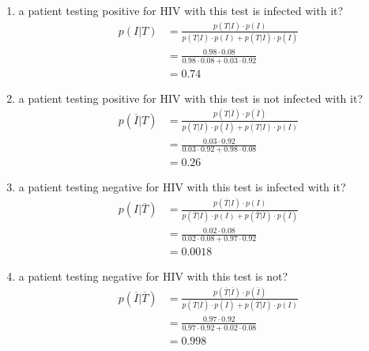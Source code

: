 \documentclass[a4paper]{article}
\begin{document}
\begin{enumerate}
	\item a patient testing positive for HIV with this test is infected with it?
	      \begin{align*}
		      p(I|T) & = \frac{p(T|I) \cdot p(I)}{p(T|I) \cdot p(I) + p(T|\overline{I}) \cdot p(\overline{I})} \\
		             & = \frac{0.98 \cdot 0.08}{0.98 \cdot 0.08 + 0.03 \cdot 0.92}                             \\
		             & = 0.74
	      \end{align*}
	\item a patient testing positive for HIV with this test is not infected with it?
	      \begin{align*}
		      p(\overline{I}|T) & = \frac{p(T|\overline{I}) \cdot p(\overline{I})}{p(T|\overline{I}) \cdot p(\overline{I}) + p(T|I) \cdot p(I)} \\
		                        & = \frac{0.03 \cdot 0.92}{0.03 \cdot 0.92 + 0.98 \cdot 0.08}                                                   \\
		                        & = 0.26
	      \end{align*}
	\item a patient testing negative for HIV with this test is infected with it?
	      \begin{align*}
		      p(I|\overline{T}) & = \frac{p(\overline{T}|I) \cdot p(I)}{p(\overline{T}|I) \cdot p(I) + p(\overline{T}|\overline{I}) \cdot p(\overline{I})} \\
		                        & = \frac{0.02 \cdot 0.08}{0.02 \cdot 0.08 + 0.97 \cdot 0.92}                                                              \\
		                        & = 0.0018
	      \end{align*}
	\item a patient testing negative for HIV with this test is not?
	      \begin{align*}
		      p(\overline{I}|\overline{T}) & = \frac{p(\overline{T}|\overline{I}) \cdot p(\overline{I})}{p(\overline{T}|\overline{I}) \cdot p(\overline{I}) + p(\overline{T}|I) \cdot p(I)} \\
		                                   & = \frac{0.97 \cdot 0.92}{0.97 \cdot 0.92 + 0.02 \cdot 0.08}                                                                                    \\
		                                   & = 0.998
	      \end{align*}
\end{enumerate}
\end{document}
